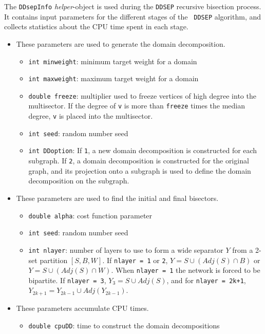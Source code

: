 \par
The {\tt DDsepInfo} {\it helper}-object is used during the {\tt DDSEP}
recursive bisection process.
It contains input parameters for the different stages of the {\tt
DDSEP} algorithm, and collects statistics about the CPU time spent
in each stage.
\par
\begin{itemize}
\item These parameters are used to generate the domain decomposition.
   \begin{itemize}
   \item {\tt int minweight}: minimum target weight for a domain
   \item {\tt int maxweight}: maximum target weight for a domain
   \item {\tt double freeze}: multiplier used to freeze vertices of high
         degree into the multisector. If the degree of {\tt v} is more
         than {\tt freeze} times the median degree, {\tt v} is placed 
         into the multisector.
   \item {\tt int seed}: random number seed
   \item {\tt int DDoption}: If {\tt 1}, a new domain decomposition is
         constructed for each subgraph. If {\tt 2}, a domain
         decomposition is constructed for the original graph,
         and its projection onto a subgraph is used to define the
         domain decomposition on the subgraph.
   \end{itemize}
\item These parameters are used to find the initial and final bisectors.
   \begin{itemize}
   \item {\tt double alpha}: cost function parameter
   \item {\tt int seed}: random number seed
   \item {\tt int nlayer}: number of layers to use to form a wide
         separator $Y$ from a 2-set partition $[S,B,W]$.
         If {\tt nlayer = 1} or {\tt 2}, 
         $Y = S \cup (Adj(S) \cap B)$
         or $Y = S \cup (Adj(S) \cap W)$.
         When {\tt nlayer = 1} the network is forced to be bipartite.
         If {\tt nlayer = 3}, $Y_3 = S \cup Adj(S)$,
         and for {\tt nlayer = 2k+1},
         $Y_{2k+1} = Y_{2k-1} \cup Adj(Y_{2k-1})$.
   \end{itemize}
\item These parameters accumulate CPU times.
   \begin{itemize}
   \item {\tt double cpuDD}: time to construct the domain decompositions

\end{itemize}
\end{itemize}

